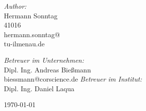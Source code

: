 \begin{titlepage}
\begin{center}
\begin{minipage}{0.4\textwidth}
\begin{flushleft} \large
\emph{Author:}\\
Hermann Sonntag \\
41016\\
hermann.sonntag@\\tu-ilmenau.de
\end{flushleft}
\end{minipage}
\begin{minipage}{0.4\textwidth}
\begin{flushright} \large
\emph{Betreuer im Unternehmen:} \\ 
Dipl. Ing. Andreas Bießmann \\
biessmann@corscience.de
\emph{Betreuer im Institut:} \\
Dipl. Ing. Daniel Laqua
\end{flushright}
\end{minipage}
 
\vfill
 
{\large \today}
 
\end{center}
 
\end{titlepage}
